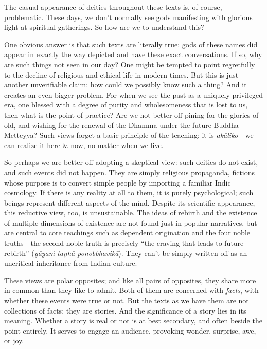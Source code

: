 \documentclass[12pt,openany]{book}%
\begin{document}
The casual appearance of deities throughout these texts is, of course, problematic. These days, we don’t normally see gods manifesting with glorious light at spiritual gatherings. So how are we to understand this?

One obvious answer is that such texts are literally true: gods of these names did appear in exactly the way depicted and have these exact conversations. If so, why are such things not seen in our day? One might be tempted to point regretfully to the decline of religious and ethical life in modern times. But this is just another unverifiable claim: how could we possibly know such a thing? And it creates an even bigger problem. For when we see the past as a uniquely privileged era, one blessed with a degree of purity and wholesomeness that is lost to us, then what is the point of practice? Are we not better off pining for the glories of old, and wishing for the renewal of the Dhamma under the future Buddha Metteyya? Such views forget a basic principle of the teaching: it is \textit{\textsanskrit{akāliko}}—we can realize it here \& now, no matter when we live.

So perhaps we are better off adopting a skeptical view: such deities do not exist, and such events did not happen. They are simply religious propaganda, fictions whose purpose is to convert simple people by importing a familiar Indic cosmology. If there is any reality at all to them, it is purely psychological; such beings represent different aspects of the mind. Despite its scientific appearance, this reductive view, too, is unsustainable. The ideas of rebirth and the existence of multiple dimensions of existence are not found just in popular narratives, but are central to core teachings such as dependent origination and the four noble truths—the second noble truth is precisely “the craving that leads to future rebirth” (\textit{\textsanskrit{yāyaṁ} \textsanskrit{taṇhā} \textsanskrit{ponobbhavikā}}). They can’t be simply written off as an uncritical inheritance from Indian culture.

These views are polar opposites; and like all pairs of opposites, they share more in common than they like to admit. Both of them are concerned with \emph{facts}, with whether these events were true or not. But the texts as we have them are not collections of facts: they are stories. And the significance of a story lies in its meaning. Whether a story is real or not is at best secondary, and often beside the point entirely. It serves to engage an audience, provoking wonder, surprise, awe, or joy.
\end{document}
